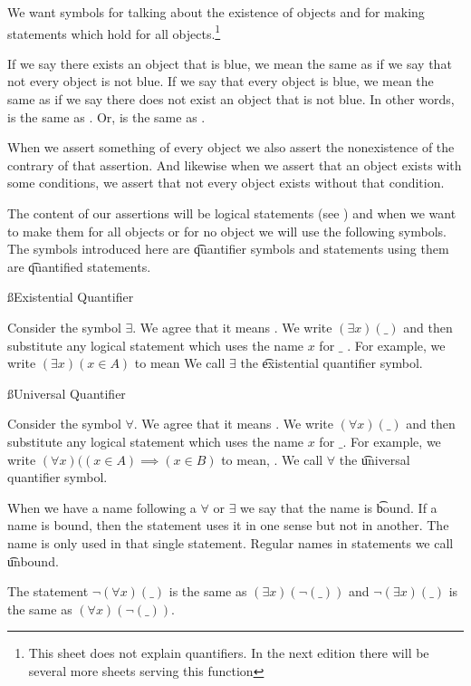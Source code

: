 

We want symbols for talking about the existence of objects and for making statements which hold for all objects.\footnote{This sheet does not explain quantifiers. In the next edition there will be several more sheets serving this function}


If we say there exists an object that is blue, we mean the same as if we say that not every object is not blue.
If we say that every object is blue, we mean the same as if we say there does not exist an object that is not blue.
In other words,  is the same as .
Or,  is the same as .

When we assert something of every object we also assert the nonexistence of the contrary of that assertion.
And likewise when we assert that an object exists with some conditions, we assert that not every object exists without that condition.

The content of our assertions will be logical statements (see ) and when we want to make them for all objects or for no object we will use the following symbols.
The symbols introduced here are \t{quantifier symbols} and statements using them are \t{quantified statements}.

\ss{Existential Quantifier}

Consider the symbol $\exists$.
We agree that it means .
We write $(\exists x)(\_)$ and then substitute any logical statement which uses the name $x$ for $\_$ .
For example, we write $(\exists x)(x \in A)$ to mean 
We call $\exists$ the \t{existential quantifier} symbol.

\ss{Universal Quantifier}

Consider the symbol $\forall$.
We agree that it means .
We write $(\forall x)(\_)$ and then substitute any logical statement which uses the name $x$ for $\_$.
For example, we write $(\forall x)((x \in A)\implies(x \in B)$ to mean, .
We call $\forall$ the \t{universal quantifier} symbol.


When we have a name following a $\forall$ or $\exists$ we say that the name is \t{bound}.
If a name is bound, then the statement uses it in one sense but not in another.
The name is only used in that single statement.
Regular names in statements we call \t{unbound}.


The statement $\neg(\forall x)(\_)$ is the same as $(\exists x)(\neg(\_))$ and $\neg(\exists x)(\_)$ is the same as $(\forall x)(\neg(\_))$.
